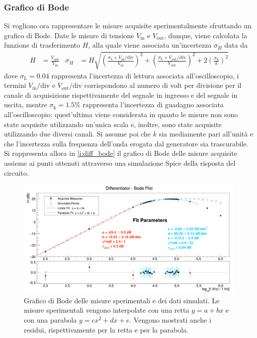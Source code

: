 \documentclass[a4paper,11pt]{article} %
\begin{document}

\subsubsection{Grafico di Bode}
Si vogliono ora rappresentare le misure acquisite sperimentalmente sfruttando un grafico di Bode. Date le misure di
tensione $V_{\text{in}}$ e $V_{\text{out}}$, dunque, viene calcolata la funzione di trasferimento $H$, alla quale viene
associata un'incertezza $\sigma_{H}$ data da
\begin{align}\label{e:diff_err}
	H&=\frac{V_{\text{out}}}{V_{\text{in}}} & 
	\sigma_{H}&= H \sqrt{	
						\left(	\frac{	\sigma_{\text{L}}\times V_{\text{in}}/\text{div}	}{	V_{\text{in}}	}	\right)^2	 + 
						\left(	\frac{	\sigma_{\text{L}}\times V_{\text{out}}/\text{div}	}{	V_{\text{out}}	}	\right)^2 +	
						2\left(	\frac{	\sigma_{\text{k}}	}{	k	}	\right)^2 }	
\end{align}
\noindent dove $\sigma_{\text{L}}=0.04$ rappresenta l'incertezza di lettura associata all'oscilloscopio, i termini
$V_{\text{in}}/\text{div}$ e $V_{\text{out}}/\text{div}$ corrispondono al numero di volt per divisione per il canale di
acquisizione rispettivamente del segnale in ingresso e del segnale in uscita, mentre $\sigma_{\text{k}}=1.5\%$
rappresenta l'incertezza di guadagno associata all'oscilloscopio: quest'ultima viene considerata in quanto le misure non
sono state acquisite utilizzando un'unica scala e, inoltre, sono state acquisite utilizzando due diversi canali. Si
assume poi che $k$ sia mediamente pari all'unità e che l'incertezza sulla frequenza dell'onda erogata dal generatore sia
trascurabile. Si rappresenta allora in \autoref{i:diff_bode} il grafico di Bode delle misure acquisite assieme ai punti
ottenuti attraverso una simulazione Spice della risposta del circuito. \newpage
\begin{figure}[H]
	\centering
	\includegraphics[width=\linewidth]{../Plots/Report_Plots/diff_bode.png}
	\caption{\small Grafico di Bode delle misure sperimentali e dei dati simulati. Le misure sperimentali vengono
	interpolate con una retta $y = a + bx$ e con una parabola $y = cx^2+dx+e$. Vengono mostrati anche i residui, 
	rispettivamente per la retta e per la parabola.}
	\label{i:diff_bode}
\end{figure}
\end{document}
